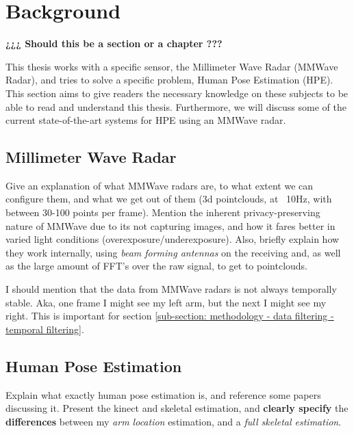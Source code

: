 \section{Background}
\label{section: introduction - background}

\textbf{¿¿¿ Should this be a section or a chapter ???}

This thesis works with a specific sensor, the Millimeter Wave Radar (MMWave Radar), and tries to solve a specific problem, Human Pose Estimation (HPE). 
This section aims to give readers the necessary knowledge on these subjects to be able to read and understand this thesis.
Furthermore, we will discuss some of the current state-of-the-art systems for HPE using an MMWave radar.


\subsection{Millimeter Wave Radar}
\label{sub-section: introduction - background - millimeter wave radar}
Give an explanation of what MMWave radars are, to what extent we can configure them, and what we get out of them (3d pointclouds, at ~10Hz, with between 30-100 points per frame).
Mention the inherent privacy-preserving nature of MMWave due to its not capturing images, and how it fares better in varied light conditions (overexposure/underexposure).
Also, briefly explain how they work internally, using \textit{beam forming antennas} on the receiving and, as well as the large amount of FFT's over the raw signal, to get to pointclouds.

I should mention that the data from MMWave radars is not always temporally stable.
Aka, one frame I might see my left arm, but the next I might see my right.
This is important for section \cref{sub-section: methodology - data filtering - temporal filtering}.

\subsection{Human Pose Estimation}
\label{sub-section: introduction - background - human pose estimation}
Explain what exactly human pose estimation is, and reference some papers discussing it. 
Present the kinect and skeletal estimation, and \textbf{clearly specify} the \textbf{differences} between my \textit{arm location} estimation, and a \textit{full skeletal estimation}.

